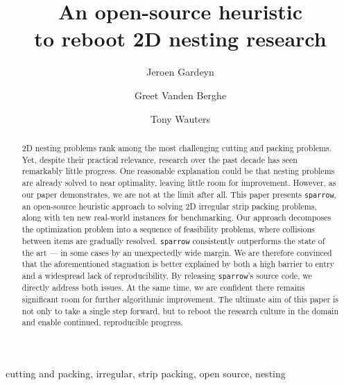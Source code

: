 \documentclass[preprint, 11pt, authoryear]{elsarticle}
\begin{document}
\begin{frontmatter}
	\title{\huge\textbf{An open-source heuristic \\ to reboot 2D nesting research}}

	\author[1]{Jeroen Gardeyn}

    \author[1]{Greet Vanden Berghe}
	
	\author[1]{Tony Wauters}
	
	
	\address[1]{KU Leuven, Department of Computer Science, NUMA, Belgium}
	
	\begin{abstract}
        2D nesting problems rank among the most challenging cutting and packing problems.
        Yet, despite their practical relevance, research over the past decade has seen remarkably little progress.
        One reasonable explanation could be that nesting problems are already solved to near optimality, leaving little room for improvement.
        However, as our paper demonstrates, we are not at the limit after all.
        This paper presents \texttt{sparrow}, an open-source heuristic approach to solving 2D irregular strip packing problems, along with ten new real-world instances for benchmarking.
        Our approach decomposes the optimization problem into a sequence of feasibility problems, where collisions between items are gradually resolved.
        \texttt{sparrow} consistently outperforms the state of the art — in some cases by an unexpectedly wide margin.
        We are therefore convinced that the aforementioned stagnation is better explained by both a high barrier to entry and a widespread lack of reproducibility.
        By releasing \texttt{sparrow}'s source code, we directly address both issues.
        At the same time, we are confident there remains significant room for further algorithmic improvement.
        The ultimate aim of this paper is not only to take a single step forward, but to reboot the research culture in the domain and enable continued, reproducible progress.
    \end{abstract}
	\begin{keyword}
		cutting and packing, irregular, strip packing, open source, nesting
	\end{keyword}
\end{frontmatter}
\end{document}
